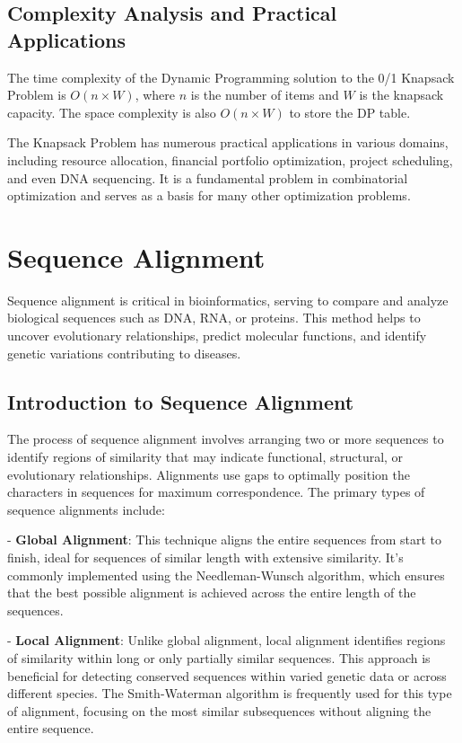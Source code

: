 \documentclass[12pt]{book} %
\begin{document}
\subsection{Complexity Analysis and Practical Applications}

The time complexity of the Dynamic Programming solution to the 0/1 Knapsack Problem is \(O(n \times W)\), where \(n\) is the number of items and \(W\) is the knapsack capacity. The space complexity is also \(O(n \times W)\) to store the DP table.

The Knapsack Problem has numerous practical applications in various domains, including resource allocation, financial portfolio optimization, project scheduling, and even DNA sequencing. It is a fundamental problem in combinatorial optimization and serves as a basis for many other optimization problems.

\section{Sequence Alignment}

Sequence alignment is critical in bioinformatics, serving to compare and analyze biological sequences such as DNA, RNA, or proteins. This method helps to uncover evolutionary relationships, predict molecular functions, and identify genetic variations contributing to diseases.

\subsection{Introduction to Sequence Alignment}

The process of sequence alignment involves arranging two or more sequences to identify regions of similarity that may indicate functional, structural, or evolutionary relationships. Alignments use gaps to optimally position the characters in sequences for maximum correspondence. The primary types of sequence alignments include:

- \textbf{Global Alignment}: This technique aligns the entire sequences from start to finish, ideal for sequences of similar length with extensive similarity. It's commonly implemented using the Needleman-Wunsch algorithm, which ensures that the best possible alignment is achieved across the entire length of the sequences.

- \textbf{Local Alignment}: Unlike global alignment, local alignment identifies regions of similarity within long or only partially similar sequences. This approach is beneficial for detecting conserved sequences within varied genetic data or across different species. The Smith-Waterman algorithm is frequently used for this type of alignment, focusing on the most similar subsequences without aligning the entire sequence.
\end{document}
